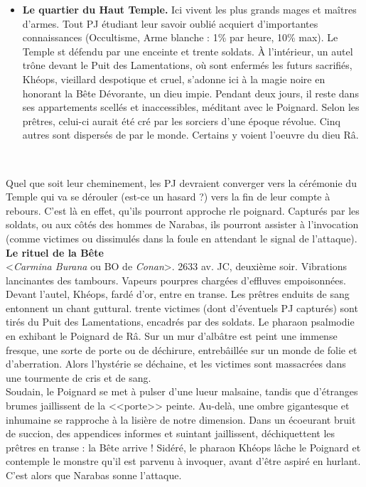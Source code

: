 \documentclass[11pt,twoside,a4paper]{book}
\begin{document}
\begin{itemize}
	\item \textbf{Le quartier du Haut Temple. }Ici vivent les plus grands mages et ma{\^i}tres d'armes. Tout PJ {\'e}tudiant leur savoir oubli{\'e} acquiert d'importantes connaissances (Occultisme, Arme blanche : 1\% par heure, 10\% max). Le Temple st d{\'e}fendu par une enceinte et trente soldats. {\`A} l'int{\'e}rieur, un autel tr{\^o}ne devant le Puit des Lamentations, o{\`u} sont enferm{\'e}s les futurs sacrifi{\'e}s, Kh{\'e}ops, vieillard despotique et cruel, s'adonne ici {\`a} la magie noire en honorant la B{\^e}te D{\'e}vorante, un dieu impie. Pendant deux jours, il reste dans ses appartements scell{\'e}s et inaccessibles, m{\'e}ditant avec le Poignard. Selon les pr{\^e}tres, celui-ci aurait {\'e}t{\'e} cr{\'e} par les sorciers d'une {\'e}poque r{\'e}volue. Cinq autres sont dispers{\'e}s de par le monde. Certains y voient l'oeuvre du dieu R{\^a}.
\end{itemize}~\\
\setlength\parindent{0pt}

Quel que soit leur cheminement, les PJ devraient converger vers la c{\'e}r{\'e}monie du Temple qui va se d{\'e}rouler (est-ce un hasard ?) vers la fin de leur compte {\`a} rebours. C'est l{\`a} en effet, qu'ils pourront approche rle poignard. Captur{\'e}s par les soldats, ou aux c{\^o}t{\'e}s des hommes de Narabas, ils pourront assister {\`a} l'invocation (comme victimes ou dissimul{\'e}s dans la foule en attendant le signal de l'attaque).~\\

\textbf{\large Le rituel de la B{\^e}te}~\\

<\emph{Carmina Burana} ou BO de \emph{Conan}>. 2633 av. JC, deuxi{\`e}me soir. Vibrations lancinantes des tambours. Vapeurs pourpres charg{\'e}es d'effluves empoisonn{\'e}es. Devant l'autel, Kh{\'e}ops, fard{\'e} d'or, entre en transe. Les pr{\^e}tres enduits de sang entonnent un chant guttural. trente victimes (dont d'{\'e}ventuels PJ captur{\'e}s) sont tir{\'e}s du Puit des Lamentations, encadr{\'e}s par des soldats. Le pharaon psalmodie en exhibant le Poignard de R{\^a}. Sur un mur d'alb{\^a}tre est peint une immense fresque, une sorte de porte ou de d{\'e}chirure, entreb{\^a}ill{\'e}e sur un monde de folie et d'aberration. Alors l'hyst{\'e}rie se d{\'e}chaine, et les victimes sont massacr{\'e}es dans une tourmente de cris et de sang.~\\

Soudain, le Poignard se met {\`a} pulser d'une lueur malsaine, tandis que d'{\'e}tranges brumes jaillissent de la <<porte>> peinte. Au-del{\`a}, une ombre gigantesque et inhumaine se rapproche {\`a} la lisi{\`e}re de notre dimension. Dans un {\'e}coeurant bruit de succion, des appendices informes et suintant jaillissent, d{\'e}chiquettent les pr{\^e}tres en transe : la B{\^e}te arrive ! Sid{\'e}r{\'e}, le pharaon Kh{\'e}ops l{\^a}che le Poignard et contemple le monstre qu'il est parvenu {\`a} invoquer, avant d'{\^e}tre aspir{\'e} en hurlant. C'est alors que Narabas sonne l'attaque.~\\
\end{document}
